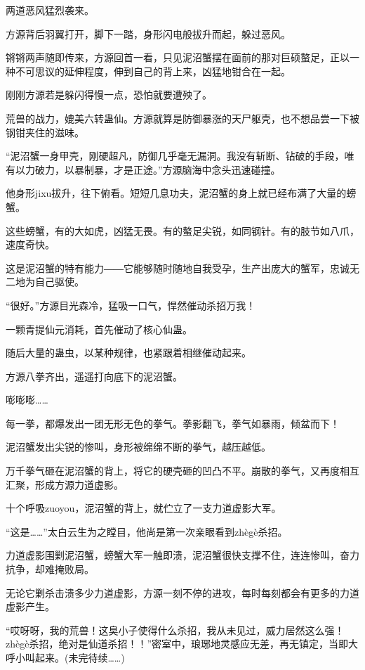 \begin{this_body}
两道恶风猛烈袭来。

方源背后羽翼打开，脚下一踏，身形闪电般拔升而起，躲过恶风。

锵锵两声随即传来，方源回首一看，只见泥沼蟹摆在面前的那对巨硕螯足，正以一种不可思议的延伸程度，伸到自己的背上来，凶猛地钳合在一起。

刚刚方源若是躲闪得慢一点，恐怕就要遭殃了。

荒兽的战力，媲美六转蛊仙。方源就算是防御暴涨的天尸躯壳，也不想品尝一下被钢钳夹住的滋味。

“泥沼蟹一身甲壳，刚硬超凡，防御几乎毫无漏洞。我没有斩断、钻破的手段，唯有以力破力，以暴制暴，才是正途。”方源脑海中念头迅速碰撞。

他身形jixu拔升，往下俯看。短短几息功夫，泥沼蟹的身上就已经布满了大量的螃蟹。

这些螃蟹，有的大如虎，凶猛无畏。有的螯足尖锐，如同钢针。有的肢节如八爪，速度奇快。

这是泥沼蟹的特有能力――它能够随时随地自我受孕，生产出庞大的蟹军，忠诚无二地为自己驱使。

“很好。”方源目光森冷，猛吸一口气，悍然催动杀招万我！

一颗青提仙元消耗，首先催动了核心仙蛊。

随后大量的蛊虫，以某种规律，也紧跟着相继催动起来。

方源八拳齐出，遥遥打向底下的泥沼蟹。

嘭嘭嘭……

每一拳，都爆发出一团无形无色的拳气。拳影翻飞，拳气如暴雨，倾盆而下！

泥沼蟹发出尖锐的惨叫，身形被绵绵不断的拳气，越压越低。

万千拳气砸在泥沼蟹的背上，将它的硬壳砸的凹凸不平。崩散的拳气，又再度相互汇聚，形成方源力道虚影。

十个呼吸zuoyou，泥沼蟹的背上，就伫立了一支力道虚影大军。

“这是……”太白云生为之瞠目，他尚是第一次亲眼看到zhègè杀招。

力道虚影围剿泥沼蟹，螃蟹大军一触即溃，泥沼蟹很快支撑不住，连连惨叫，奋力抗争，却难掩败局。

无论它剿杀击溃多少力道虚影，方源一刻不停的进攻，每时每刻都会有更多的力道虚影产生。

“哎呀呀，我的荒兽！这臭小子使得什么杀招，我从未见过，威力居然这么强！zhègè杀招，绝对是仙道杀招！！”密室中，琅琊地灵感应无差，再无镇定，当即大呼小叫起来。(未完待续……)

\end{this_body}

